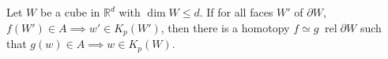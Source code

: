 \documentclass{article}
\numberwithin{equation}{section}
\newcommand{\R}{\mathbb{R}}
\DeclareMathOperator{\rel}{rel}
\begin{document}
\begin{lemma}
	Let $W$ be a cube in $\R^d$ with $\dim W\leq d$. If for all faces $W'$ of $\partial W$, $f(W')\in A\implies w'\in K_p(W')$, then there is a homotopy $f\simeq g\;\rel\partial W$ such that $g(w)\in A\implies w\in K_p(W)$.
\end{lemma}

\printbibliography
\end{document}
